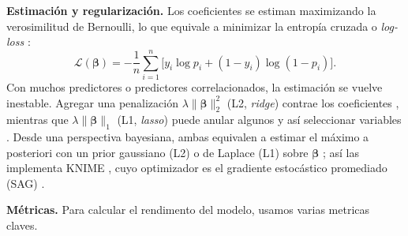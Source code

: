 \documentclass[
  journal=largetwo,
  manuscript=Laboratorio-Numero-02,
  year=2026,
  volume=1
]{cup-journal}
\begin{document}
\textbf{Estimación y regularización.} Los coeficientes se estiman maximizando la verosimilitud de Bernoulli, lo que equivale a minimizar la entropía cruzada o \textit{log-loss} \autocite{hastie2009esl}:
\begin{equation}
\mathcal{L}(\boldsymbol\beta)=-\frac{1}{n}\sum_{i=1}^{n}\bigl[y_i\log p_i+(1-y_i)\log(1-p_i)\bigr].
\label{eq:logloss}
\end{equation}
Con muchos predictores o predictores correlacionados, la estimación se vuelve inestable. Agregar una penalización $\lambda\lVert\boldsymbol\beta\rVert_2^2$ (L2, \textit{ridge}) contrae los coeficientes \autocite{hoerl1970ridge}, mientras que $\lambda\lVert\boldsymbol\beta\rVert_1$ (L1, \textit{lasso}) puede anular algunos y así seleccionar variables \autocite{tibshirani1996lasso}. Desde una perspectiva bayesiana, ambas equivalen a estimar el máximo a posteriori con un prior gaussiano (L2) o de Laplace (L1) sobre $\boldsymbol\beta$ \autocite{hastie2009esl}; así las implementa KNIME \autocite{berthold2009knime}, cuyo optimizador es el gradiente estocástico promediado (SAG) \autocite{schmidt2017sag}.

\textbf{Métricas.} Para calcular el rendimento del modelo, usamos varias metricas claves.
\end{document}

